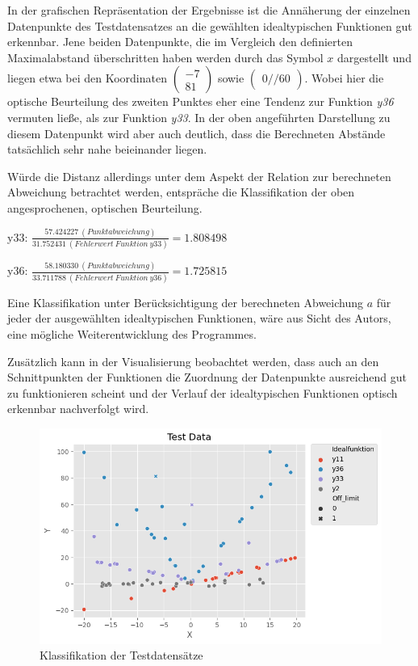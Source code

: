 In der grafischen Repräsentation der Ergebnisse ist die Annäherung der einzelnen Datenpunkte des Testdatensatzes an die gewählten idealtypischen Funktionen gut erkennbar. Jene beiden Datenpunkte, die im Vergleich den definierten Maximalabstand überschritten haben werden durch das Symbol $x$ dargestellt und liegen etwa bei den Koordinaten 
$ \begin{pmatrix}-7 \\81 \end{pmatrix}$ sowie 
$ \begin{pmatrix}0 // 60 \end{pmatrix}$. 
Wobei hier die optische Beurteilung des zweiten Punktes eher eine Tendenz zur Funktion \emph{y36} vermuten ließe, als zur Funktion \emph{y33}. In der oben angeführten Darstellung zu diesem Datenpunkt wird aber auch deutlich, dass die Berechneten Abstände tatsächlich sehr nahe beieinander liegen.

Würde die Distanz allerdings unter dem Aspekt der Relation zur berechneten Abweichung betrachtet werden, entspräche die Klassifikation der oben angesprochenen, optischen Beurteilung. 

\begin{center}
y33: $ \frac{57.424227\ (Punktabweichung)}{31.752431\ (Fehlerwert\ Funktion\ y33)} = 1.808498 $ 

y36: $ \frac{58.180330\ (Punktabweichung)}{33.711788\ (Fehlerwert\ Funktion\ y36)} = 1.725815 $
\end{center}

Eine Klassifikation unter Berücksichtigung der berechneten Abweichung $a$ für jeder der ausgewählten idealtypischen Funktionen, wäre aus Sicht des Autors, eine mögliche Weiterentwicklung des Programmes.

Zusätzlich kann in der Visualisierung beobachtet werden, dass auch an den Schnittpunkten der Funktionen die Zuordnung der Datenpunkte ausreichend gut zu funktionieren scheint und der Verlauf der idealtypischen Funktionen optisch erkennbar nachverfolgt wird.

\begin{figure}[h]
\centering
\includegraphics[width=13cm]{../output/figures/test.png}
\caption{Klassifikation der Testdatensätze \cite{Gage:18}}\label{fig:test}
\end{figure}



